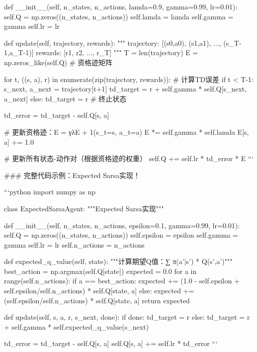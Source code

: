    def __init__(self, n_states, n_actions, lamda=0.9, gamma=0.99, lr=0.01):
        self.Q = np.zeros((n_states, n_actions))
        self.lamda = lamda
        self.gamma = gamma
        self.lr = lr
    
    def update(self, trajectory, rewards):
        """
        trajectory: [(s0,a0), (s1,a1), ..., (s_{T-1},a_{T-1})]
        rewards: [r1, r2, ..., r_T]
        """
        T = len(trajectory)
        E = np.zeros_like(self.Q)  # 资格迹矩阵
        
        for t, ((s, a), r) in enumerate(zip(trajectory, rewards)):
            # 计算TD误差
            if t < T-1:
                s_next, a_next = trajectory[t+1]
                td_target = r + self.gamma * self.Q[s_next, a_next]
            else:
                td_target = r  # 终止状态
            
            td_error = td_target - self.Q[s, a]
            
            # 更新资格迹：E = γλE + 1(s_t=s, a_t=a)
            E *= self.gamma * self.lamda
            E[s, a] += 1.0
            
            # 更新所有状态-动作对（根据资格迹的权重）
            self.Q += self.lr * td_error * E
```

### 完整代码示例：Expected Sarsa实现！

```python
import numpy as np

class ExpectedSarsaAgent:
    """Expected Sarsa实现"""
    
    def __init__(self, n_states, n_actions, epsilon=0.1, gamma=0.99, lr=0.01):
        self.Q = np.zeros((n_states, n_actions))
        self.epsilon = epsilon
        self.gamma = gamma
        self.lr = lr
        self.n_actions = n_actions
    
    def expected_q_value(self, state):
        """计算期望Q值：∑ π(a'|s') * Q(s',a')"""
        best_action = np.argmax(self.Q[state])
        expected = 0.0
        for a in range(self.n_actions):
            if a == best_action:
                expected += (1.0 - self.epsilon + self.epsilon/self.n_actions) * self.Q[state, a]
            else:
                expected += (self.epsilon/self.n_actions) * self.Q[state, a]
        return expected
    
    def update(self, s, a, r, s_next, done):
        if done:
            td_target = r
        else:
            td_target = r + self.gamma * self.expected_q_value(s_next)
        
        td_error = td_target - self.Q[s, a]
        self.Q[s, a] += self.lr * td_error
```

